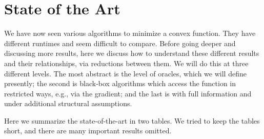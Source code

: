 %

\section{State of the Art}

We have now seen various algorithms to minimize a convex function.
They have different runtimes and seem difficult to compare. Before
going deeper and discussing more results, here we discuss how to understand
these different results and their relationships, via reductions between
them. We will do this at three different levels. The most abstract
is the level of oracles, which we will define presently; the second
is black-box algorithms which access the function in restricted ways,
e.g., via the gradient; and the last is with full information and
under additional structural assumptions.

Here we summarize the state-of-the-art in two tables. We tried to
keep the tables short, and there are many important results omitted.

